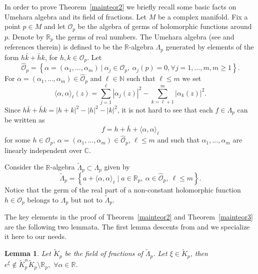 \documentclass[12pt]{amsart}
\newcommand{\R}{\mathbb{R}}
\newcommand{\N}{\mathbb{N}}
\newcommand{\C}{\mathbb{C}}
\newcommand{\OO}{{\mathcal{O}}}
\newtheorem{lem}[theor]{Lemma}
\begin{document}
In order to prove Theorem~\ref{mainteor2} we briefly recall some basic facts on Umehara algebra and its field of fractions.
Let $M$ be a complex manifold. Fix a point  $p\in M$ and let 
$\OO_p$ be the algebra of germs of holomorphic functions around $p$.
Denote  by $\R_p$ the germs of real numbers. 
The Umehara algebra (see  \cite{LoiMossa21KRSIntoComplexSpaceForms,Umehara88Diastases} and references therein) is defined  to be the $\R$-algebra $\Lambda_p$ generated
by elements of the form  $h\bar k+\bar h k$, for $h, k\in \OO_p$. 
Let
$$\hat\OO_p=\left\{\alpha =(\alpha_1,   \dots ,\alpha_m) \ | \   \alpha_j\in\OO_p,\ \alpha_j(p)=0 , \forall j=1, \dots , m, m\geq 1\right\}.$$
For  $\alpha =(\alpha_1,  \dots ,\alpha_m)\in \hat\OO_p$
and $\ell\in\N$ such that $\ell\leq m$
we set
$$\langle \alpha, \alpha\rangle_{\ell}(z)=\sum_{j=1}^\ell|\alpha_j(z)|^2- \sum_{k=\ell+1}^{m}|\alpha_k(z)|^2.$$
Since $h\bar k+\bar h k=|h+k|^2-|h|^2-|k|^2$, it is not hard to see 
that each $f \in \Lambda_p$  can be written  as
$$f=h+\bar h+\langle \alpha, \alpha\rangle_{\ell}$$
for some $h\in \OO_p$, $\alpha =(\alpha_1,  \dots ,\alpha_m)\in \hat\OO_p$, 
$\ell\leq m$
and such that  $\alpha_1, \dots , \alpha_m$  are linearly independent over $\C$.


Consider  the $\R$-algebra $\tilde\Lambda_p\subset \Lambda_p$ given by
\begin{equation}\label{Lambda0}
\tilde\Lambda_p=\left\{a+ \langle \alpha, \alpha\rangle_{\ell} \mid a\in \R_p,\ \alpha\in \hat\OO_p,\  \ell\leq m\right\}.
\end{equation}
Notice that the germ of the real part of a non-constant  holomorphic function 
$h\in\OO_p$ belongs to 
$\Lambda_p$ but not to 
$\tilde\Lambda_p$. 

The key elements in the proof of Theorem~\ref{mainteor2} and Theorem~\ref{mainteor3} are  the following two  lemmata.
 The first lemma descents from  \cite[Theorem~2.1]{LoiMossa22HBD} and we specialize it here to our needs.

\begin{lem}\label{LemLogConst}
Let $\tilde K_p$ be the field of fractions of  $\tilde\Lambda_p$.
Let $\xi\in \tilde K_p$, then
$e^\xi\not\in \tilde K_p^\alpha\tilde K_p\setminus \R_p ,$
$\forall \alpha\in\R$.
\end{lem}
\end{document}
